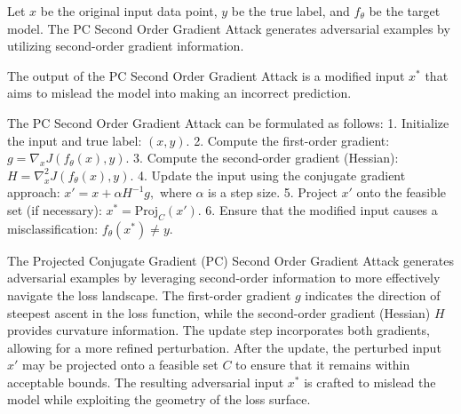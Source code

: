 Let \( x \) be the original input data point, \( y \) be the true label, and \( f_{\theta} \) be the target model. The PC Second Order Gradient Attack generates adversarial examples by utilizing second-order gradient information.

The output of the PC Second Order Gradient Attack is a modified input \( x^* \) that aims to mislead the model into making an incorrect prediction.

The PC Second Order Gradient Attack can be formulated as follows:
1. Initialize the input and true label:
   $
   (x, y).
   $
2. Compute the first-order gradient:
   $
   g = \nabla_x J(f_{\theta}(x), y).
   $
3. Compute the second-order gradient (Hessian):
   $
   H = \nabla^2_x J(f_{\theta}(x), y).
   $
4. Update the input using the conjugate gradient approach:
   $
   x' = x + \alpha H^{-1} g,
   $
   where \( \alpha \) is a step size.
5. Project \( x' \) onto the feasible set (if necessary):
   $
   x^* = \text{Proj}_C(x').
   $
6. Ensure that the modified input causes a misclassification:
   $
   f_{\theta}(x^*) \neq y.
   $

The Projected Conjugate Gradient (PC) Second Order Gradient Attack generates adversarial examples by leveraging second-order information to more effectively navigate the loss landscape. The first-order gradient \( g \) indicates the direction of steepest ascent in the loss function, while the second-order gradient (Hessian) \( H \) provides curvature information. The update step incorporates both gradients, allowing for a more refined perturbation. After the update, the perturbed input \( x' \) may be projected onto a feasible set \( C \) to ensure that it remains within acceptable bounds. The resulting adversarial input \( x^* \) is crafted to mislead the model while exploiting the geometry of the loss surface.
